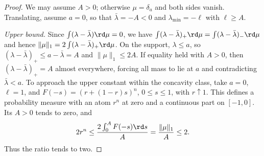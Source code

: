 \begin{proof}
We may assume $A>0$; otherwise $\mu=\delta_a$ and both sides vanish.
Translating, assume $a=0$, so that $\bar\lambda=-A<0$ and
$\lambda_{\min}=-\ell$ with $\ell\ge A$.

\emph{Upper bound.}  Since $\int(\lambda-\bar\lambda)\rd\mu=0$, we have
$\int(\lambda-\bar\lambda)_+\rd\mu=\int(\lambda-\bar\lambda)_-\rd\mu$ and
hence $\|\mu\|_1=2\int(\lambda-\bar\lambda)_+\rd\mu$.  On the support,
$\lambda\le a$, so $(\lambda-\bar\lambda)_+\le a-\bar\lambda=A$ and
$\|\mu\|_1\le2A$.  If equality held with $A>0$, then
$(\lambda-\bar\lambda)_+=A$ almost everywhere, forcing all mass to
lie at $a$ and contradicting $\bar\lambda<a$.  To approach the upper
constant within the concavity class, take $a=0$, $\ell=1$, and
$F(-s)=(r+(1-r)s)^n$, $0\le s\le1$, with $r\uparrow1$.
This defines a probability measure with an atom $r^n$ at zero and a
continuous part on $[-1,0]$.  Its $A>0$ tends to zero, and
\[
 2r^n\le\frac{2\int_0^A F(-s)\rd s}{A}
       =\frac{\|\mu\|_1}{A}\le2.
\]
Thus the ratio tends to two.


\end{proof}
